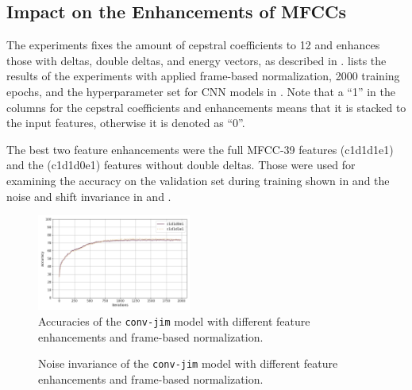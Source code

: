 \subsection{Impact on the Enhancements of MFCCs}\label{sec:exp_fs_mfcc}
The experiments fixes the amount of cepstral coefficients to 12 and enhances those with deltas, double deltas, and energy vectors, as described in .
 lists the results of the experiments with applied frame-based normalization, 2000 training epochs, and the hyperparameter set for CNN models in .
Note that a \enquote{1} in the columns for the cepstral coefficients and enhancements means that it is stacked to the input features, otherwise it is denoted as \enquote{0}.

The best two feature enhancements were the full MFCC-39 features (c1d1d1e1) and the (c1d1d0e1) features without double deltas.
Those were used for examining the accuracy on the validation set during training shown in  and the noise and shift invariance in  and .
\begin{figure}[!ht]
  \centering
  \includegraphics[width=0.45\textwidth]{./5_exp/figs/exp_fs_mfcc_acc_conv-jim.png}
  \caption{Accuracies of the \texttt{conv-jim} model with different feature enhancements and frame-based normalization.}
  \label{fig:exp_fs_mfcc_tb_acc_conv-jim}
\end{figure}
\FloatBarrier
\noindent
\begin{figure}[!ht]
  \centering
  \caption{Noise invariance of the \texttt{conv-jim} model with different feature enhancements and frame-based normalization.}
  \label{fig:exp_fs_mfcc_tb_noise_conv-jim}
\end{figure}
